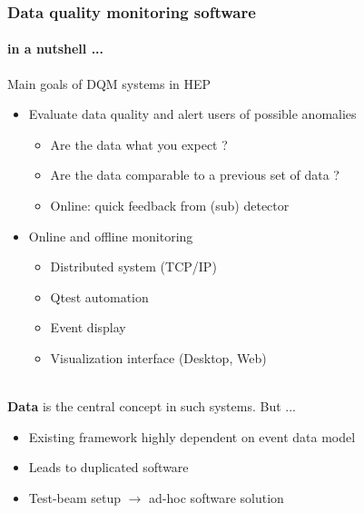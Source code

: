 \documentclass[presentation, 10pt]{beamer}
\begin{document}
\begin{frame}
  \frametitle{Data quality monitoring software}
  \framesubtitle{in a nutshell ...}
  \footnotesize
  Main goals of DQM systems in HEP
  \begin{itemize}
    \item Evaluate data quality and alert users of possible anomalies
    \begin{itemize}
      \scriptsize
      \item Are the data what you expect ?
      \item Are the data comparable to a previous set of data ?
      \item Online: quick feedback from (sub) detector
    \end{itemize}
    \item Online and offline monitoring
    \begin{itemize}
      \scriptsize
      \item Distributed system (TCP/IP)
      \item Qtest automation
      \item Event display
      \item Visualization interface (Desktop, Web)
    \end{itemize}
  \end{itemize}
  ~ \\
  \textbf{Data} is the central concept in such systems. But ...
  \begin{itemize}
    \item Existing framework highly dependent on event data model
    \item Leads to duplicated software
    \item Test-beam setup $\rightarrow$ ad-hoc software solution
  \end{itemize}
  ~ \\
  \centering {}
\end{frame}
\end{document}

